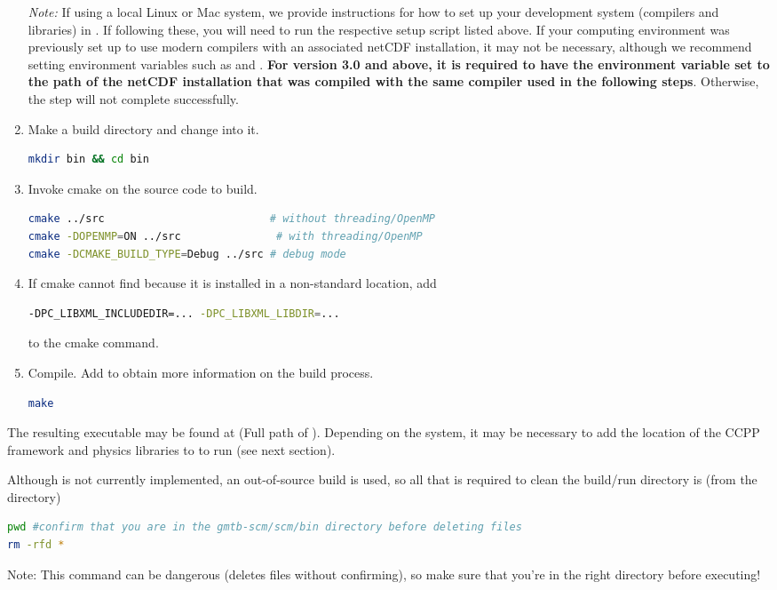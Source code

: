 \begin{enumerate}
\emph{Note:} If using a local Linux or Mac system, we provide instructions for how to set up your development system (compilers and libraries) in . If following these, you will need to run the respective setup script listed above. If your computing environment was previously set up to use modern compilers with an associated netCDF installation, it may not be necessary, although we recommend setting environment variables such as  and . \textbf{For version 3.0 and above, it is required to have the  environment variable set to the path of the netCDF installation that was compiled with the same compiler used in the following steps}. Otherwise, the  step will not complete successfully.

    \item Make a build directory and change into it.
\begin{lstlisting}[language=bash]
mkdir bin && cd bin
\end{lstlisting}
    \item Invoke cmake on the source code to build.
\begin{lstlisting}[language=bash]
cmake ../src                          # without threading/OpenMP
cmake -DOPENMP=ON ../src               # with threading/OpenMP
cmake -DCMAKE_BUILD_TYPE=Debug ../src # debug mode
\end{lstlisting}
    \item If cmake cannot find  because it is installed in a non-standard location, add
\begin{lstlisting}[language=bash]
-DPC_LIBXML_INCLUDEDIR=... -DPC_LIBXML_LIBDIR=...
\end{lstlisting}
    to the cmake command.
    \item Compile. Add  to obtain more information on the build process.
\begin{lstlisting}[language=bash]
make
\end{lstlisting}
\end{enumerate}

The resulting executable may be found at  (Full path of ). Depending on the system, it may be necessary to add the location of the CCPP framework and physics libraries to  to run  (see next section).

Although  is not currently implemented, an out-of-source build is used, so all that is required to clean the build/run directory is (from the  directory)
\begin{lstlisting}[language=bash]
pwd #confirm that you are in the gmtb-scm/scm/bin directory before deleting files
rm -rfd *
\end{lstlisting}
Note: This command can be dangerous (deletes files without confirming), so make sure that you're in the right directory before executing!

